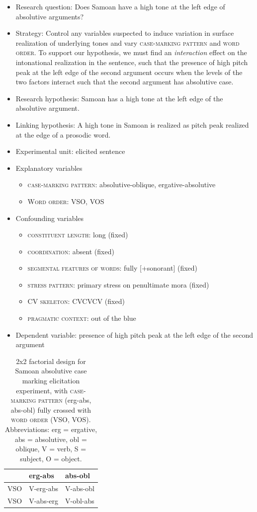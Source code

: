 \documentclass[12pt]{article}
\begin{document}
\begin{itemize}
  \item Research question: Does Samoan have a high tone at the left edge
  of absolutive arguments?
  \item Strategy: Control any variables suspected to induce variation in
  surface realization of underlying tones and vary
  \textsc{case-marking pattern} and \textsc{word order}. To support
  our hypothesis, we must find an \textit{interaction} effect on the
  intonational realization in the sentence, such that the presence of
  high pitch peak at the left edge of the second argument occurs when
  the levels of the two factors interact such that the second argument
  has absolutive case.
  \item Research hypothesis: Samoan has a high tone at the left edge of
  the absolutive argument.
  \item Linking hypothesis: A high tone in Samoan is realized as pitch
  peak realized at the edge of a prosodic word.
  \item Experimental unit: elicited sentence
  \item Explanatory variables
  \begin{itemize}
    \item \textsc{case-marking pattern}: absolutive-oblique,
    ergative-absolutive
    \item \textsc{Word order}: VSO, VOS
  \end{itemize}
  \item Confounding variables
  \begin{itemize}
    \item \textsc{constituent length}: long (fixed)
    \item \textsc{coordination}: absent (fixed)
    \item \textsc{segmental features of words}: fully [+sonorant] (fixed) 
    \item \textsc{stress pattern}: primary stress on penultimate mora
    (fixed)
    \item \textsc{CV skeleton}: CVCVCV (fixed)
    \item \textsc{pragmatic context}: out of the blue
  \end{itemize}
  \item Dependent variable: presence of high pitch peak at the left
    edge of the second argument
\end{itemize}

\begin{table}[!h]
  \centering
  \begin{tabular}{l | l l}
     & erg-abs & abs-obl  \\\hline
     VSO & V-erg-abs & V-abs-obl \\ 
     VSO & V-abs-erg & V-obl-abs \\ 
  \end{tabular}
  \caption{2x2 factorial design for Samoan absolutive case marking
    elicitation experiment, with \textsc{case-marking pattern}
    (erg-abs, abs-obl) fully crossed with \textsc{word order} (VSO,
    VOS). Abbreviations: erg = ergative, abs = absolutive, obl =
    oblique, V = verb, S = subject, O = object.}
  \label{tab:samoan-factorial}
\end{table}
\end{document}
